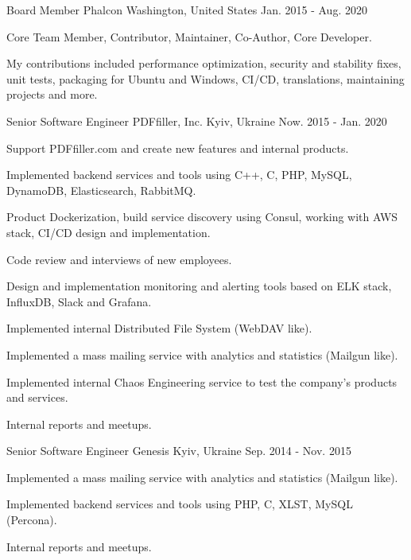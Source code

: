 \begin{cventries}
  \cventry
    {Board Member}
    {Phalcon}
    {Washington, United States}
    {Jan. 2015 - Aug. 2020}
    {
      \begin{cvitems}
        \item {Core Team Member, Contributor, Maintainer, Co-Author, Core Developer.}
        \item {My contributions included performance optimization, security and stability fixes, unit tests, packaging for Ubuntu and Windows, CI/CD, translations, maintaining projects and more.}
      \end{cvitems}
    }

  \cventry
    {Senior Software Engineer}
    {PDFfiller, Inc.}
    {Kyiv, Ukraine}
    {Now. 2015 - Jan. 2020}
    {
      \begin{cvitems}
        \item {Support PDFfiller.com and create new features and internal products.}
        \item {Implemented backend services and tools using C++, C, PHP, MySQL, DynamoDB, Elasticsearch, RabbitMQ.}
        \item {Product Dockerization, build service discovery using Consul, working with AWS stack, CI/CD design and implementation.}
        \item {Code review and interviews of new employees.}
        \item {Design and implementation monitoring and alerting tools based on ELK stack, InfluxDB, Slack and Grafana.}
        \item {Implemented internal Distributed File System (WebDAV like).}
        \item {Implemented a mass mailing service with analytics and statistics (Mailgun like).}
        \item {Implemented internal Chaos Engineering service to test the company's products and services.}
        \item {Internal reports and meetups.}
      \end{cvitems}
    }

  \cventry
    {Senior Software Engineer}
    {Genesis}
    {Kyiv, Ukraine}
    {Sep. 2014 - Nov. 2015}
    {
      \begin{cvitems}
        \item {Implemented a mass mailing service with analytics and statistics (Mailgun like).}
        \item {Implemented backend services and tools using PHP, C, XLST, MySQL (Percona).}
        \item {Internal reports and meetups.}
      \end{cvitems}
    }


\end{cventries}
